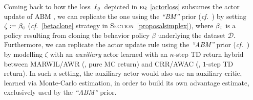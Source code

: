 Coming back to how the loss $\ell_\theta$ depicted in \textsc{eq}~\ref{actorloss} subsumes the actor update
of ABM \cite{Siegel2020-lo},
we can replicate the one using the \textit{``BM''} prior (\textit{cf.}~\cite{Siegel2020-lo})
by setting $\zeta \coloneqq \beta_\textsc{c}$
(\textit{cf.}~\ref{betaclone} strategy in \textsc{Section}~\ref{proposalsimplex}),
where $\beta_\textsc{c}$ is a policy resulting from cloning the behavior policy $\beta$
underlying the dataset $\mathcal{D}$.
Furthermore, we can replicate the actor update rule using the \textit{``ABM''} prior
(\textit{cf.}~\cite{Siegel2020-lo})
by modelling $\zeta$ with an \emph{auxiliary} actor learned with
an $n$-step TD return \cite{Peng1996-xn}
hybrid between MARWIL/AWR (\cite{Wang2018-dn, Peng2019-hu}, pure MC return)
and CRR/AWAC (\cite{Wang2020-sr, Nair2020-gd}, $1$-step TD return).
In such a setting, the auxiliary actor would also use an auxiliary critic, learned via Monte-Carlo estimation,
in order to build its own advantage estimate, exclusively used by the \textit{``ABM''} prior.

